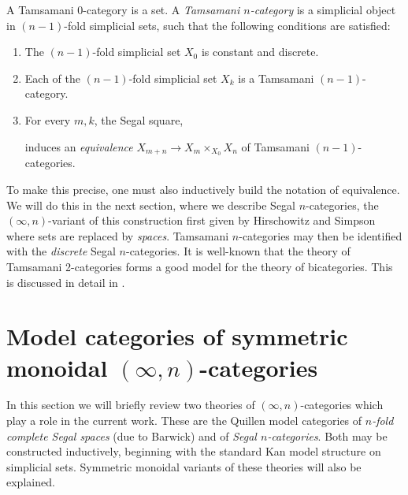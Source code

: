 \documentclass{amsart}
\begin{document}
\begin{definition}[Sketch]
	A Tamsamani $0$-category is a set. 	A {\em Tamsamani $n$-category} is a simplicial object in $(n-1)$-fold simplicial sets, such that the following conditions are satisfied:
	\begin{enumerate}
		\item The $(n-1)$-fold simplicial set $X_0$ is constant and discrete.
		\item Each of the $(n-1)$-fold simplicial set $X_k$ is a Tamsamani $(n-1)$-category.
		\item For every $m, k$, the Segal square,
		\begin{center}
		\end{center}
		induces an {\em equivalence} $X_{m+n} \to X_m \times_{X_0} X_n$ of Tamsamani $(n-1)$-categories.
	\end{enumerate}
\end{definition}

\noindent To make this precise, one must also inductively build the notation of equivalence. We will do this in the next section, where we describe Segal $n$-categories, the $(\infty,n)$-variant of this construction first given by Hirschowitz and Simpson \cite{9807049} where sets are replaced by {\em spaces}. Tamsamani $n$-categories may then be identified with the {\em discrete} Segal $n$-categories.  It is well-known that the theory of Tamsamani 2-categories forms a good model for the theory of bicategories. This is discussed in detail in \cite{MR2366560}.


\section{Model categories of symmetric monoidal $(\infty,n)$-categories} \label{sec-symmoninftyNcat}


In this section we will briefly review two theories of $(\infty,n)$-categories which play a role in the current work. These are the Quillen model categories of {\em $n$-fold complete Segal spaces} (due to Barwick) and of {\em Segal $n$-categories}. Both may be constructed inductively, beginning with the standard Kan model structure on simplicial sets. Symmetric monoidal variants of these theories will also be explained. 
\end{document}
